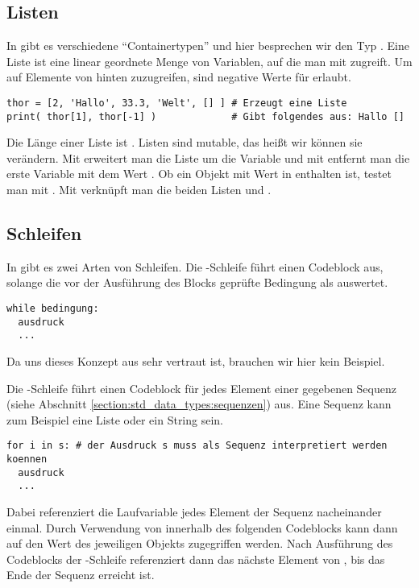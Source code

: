 \subsection{Listen}
\label{section:crashkurs:listen}
In \Python gibt es verschiedene ``Containertypen'' und hier besprechen wir den Typ .
Eine Liste  ist eine linear geordnete Menge von Variablen, auf die man mit  zugreift.
Um auf Elemente von hinten zuzugreifen, sind negative Werte für  erlaubt.
\begin{lstlisting}
thor = [2, 'Hallo', 33.3, 'Welt', [] ] # Erzeugt eine Liste
print( thor[1], thor[-1] )             # Gibt folgendes aus: Hallo []
\end{lstlisting}
Die Länge einer Liste ist .
Listen sind mutable, das heißt wir können sie verändern.
Mit  erweitert man die Liste  um die Variable  und mit  entfernt man die erste Variable mit dem Wert .
Ob ein Objekt mit Wert  in  enthalten ist, testet man mit .
Mit  verknüpft man die beiden Listen  und .


\subsection{Schleifen}
\label{section:crashkurs:schleifen}
In \Python gibt es zwei Arten von Schleifen.
Die -Schleife führt einen Codeblock aus, solange die vor der Ausführung des Blocks geprüfte Bedingung als  auswertet.
\begin{lstlisting}
while bedingung:
  ausdruck
  ...
\end{lstlisting}
Da uns dieses Konzept aus \CC sehr vertraut ist, brauchen wir hier kein Beispiel.

Die -Schleife führt einen Codeblock für jedes Element einer gegebenen Sequenz (siehe Abschnitt \ref{section:std_data_types:sequenzen}) aus.
Eine Sequenz kann zum Beispiel eine Liste oder ein String sein.
\begin{lstlisting}
for i in s: # der Ausdruck s muss als Sequenz interpretiert werden koennen
  ausdruck
  ...
\end{lstlisting}
Dabei referenziert die Laufvariable  jedes Element der Sequenz  nacheinander einmal. Durch Verwendung von  innerhalb 
des folgenden Codeblocks kann 
dann auf den Wert des jeweiligen Objekts zugegriffen werden. Nach Ausführung des Codeblocks der -Schleife referenziert 
 dann das nächste Element von , bis das Ende der Sequenz erreicht ist. 

